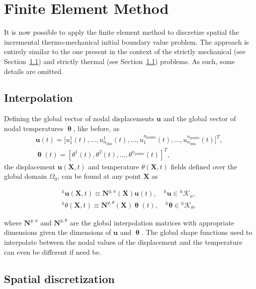 \section{Finite Element Method} \label{sec:fem}

It is now possible to apply the finite element method to discretize spatial the incremental thermo-mechanical initial boundary value problem.
The approach is entirely similar to the one present in the context of the strictly mechanical (see Section~\ref{}) and strictly thermal (see Section~\ref{}) problems.
As such, some details are omitted.

\subsection{Interpolation}

Defining the global vector of nodal displacements \(\mathbf u\) and the global vector of nodal temperatures \(\bm \uptheta\), like before, as
\begin{gather}
    \mathbf u(t) = \Big[ u_1^1(t),\dots,u^1_{n_\text{dim}}(t),\dots, u_1^{n_\text{points}}(t),\dots,u^{n_\text{points}}_{n_\text{dim}}(t)\Big]^T,\\
    \bm \uptheta(t) = \left[ \theta^1(t), \theta^2(t), \dots, \theta^{n_\text{points}}(t)\right]^T,
\end{gather}
the displacement $\bm u(\bm X, t)$ and temperature \(\theta(\bm X, t)\) fields defined over the global domain $\Omega_0$, can be found at any point $\bm X$ as
\begin{highlight}[innertopmargin=-5pt]
    \begin{gather}
        ^h\bm u(\bm X, t) \equiv \mathbf N^{g,u}(\bm X)\mathbf u(t),\quad ^h\bm u\in {}^h\mathscr{K}_u,\\
        ^h\theta(\bm X, t) \equiv \mathbf N^{g,\theta}(\bm X)\bm \uptheta(t),\quad ^h\bm \theta\in {}^h\mathscr{K}_\theta,
    \end{gather}
\end{highlight}
where \(\mathbf N^{g,u}\) and \(\mathbf N^{g,\theta}\) are the global interpolation matrices with appropriate dimensions given the dimensions of \(\mathbf u\) and \(\bm \uptheta\).
The global shape functions used to interpolate between the nodal values of the displacement and the temperature can even be different if need be.

\subsection{Spatial discretization} \label{sec:spatial_discretization}

